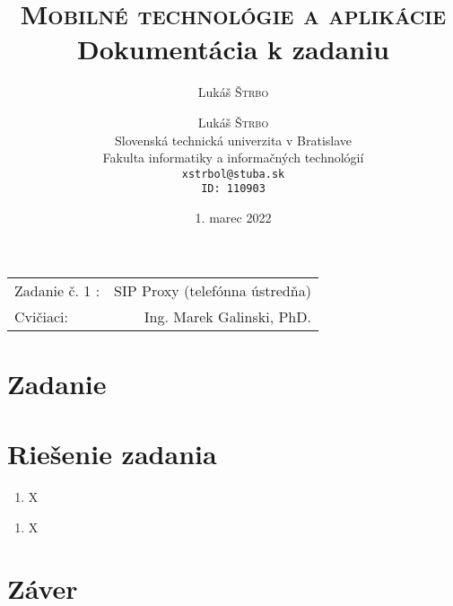 \documentclass[10pt,oneside,slovak,a4paper]{article}
\title{\textsc{Mobilné technológie a aplikácie}\\ Dokumentácia k zadaniu} %
\author{Lukáš \textsc{Štrbo}} %
\date{1. marec 2022}
\author{Lukáš \textsc{Štrbo}\\[2pt]
	{\small Slovenská technická univerzita v Bratislave}\\
	{\small Fakulta informatiky a informačných technológií}\\
	{\small \texttt{xstrbol@stuba.sk}}\\
{\small \texttt{ID: 110903}}\\
	}
\begin{document}
\maketitle %

\begin{center}
\begin{tabular}{l r}
Zadanie č. 1 : & SIP Proxy (telefónna ústredňa)\\ 
Cvičiaci: & Ing. Marek Galinski, PhD.
\end{tabular}
\end{center}

\section{Zadanie}
\section{Riešenie zadania}

\begin{enumerate}[label=\textbf{\arabic*})]
	\item X
\end{enumerate}

\begin{enumerate}[label=(\alph*)]
	\item X
\end{enumerate}



\section{Záver}




\end{document}
